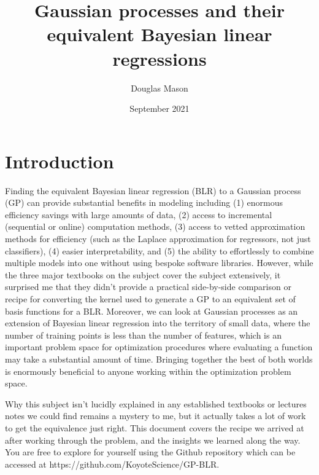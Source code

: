 \documentclass{article}
\title{Gaussian processes and their equivalent Bayesian linear regressions}
\author[1]{Douglas Mason}
\affil[1]{Koyote Science, LLC \footnote{\href{http://www.koyotescience.com}{\texttt{http://www.koyotescience.com}}}}
\date{September 2021}
\begin{document}
\maketitle

\tableofcontents

\pagestyle{fancy}

\section{Introduction}

Finding the equivalent Bayesian linear regression (BLR) to a Gaussian process (GP) can provide substantial benefits in modeling including (1) enormous efficiency savings with large amounts of data, (2) access to incremental (sequential or online) computation methods, (3) access to vetted approximation methods for efficiency (such as the Laplace approximation for regressors, not just classifiers), (4) easier interpretability, and (5) the ability to effortlessly to combine multiple models into one without using bespoke software libraries. However, while the three major textbooks on the subject \cite{bishop, murphy, rasmussen} cover the subject extensively, it surprised me that they didn't provide a practical side-by-side comparison or recipe for converting the kernel used to generate a GP to an equivalent set of basis functions for a BLR. Moreover, we can look at Gaussian processes as an extension of Bayesian linear regression into the territory of small data, where the number of training points is less than the number of features, which is an important problem space for optimization procedures where evaluating a function may take a substantial amount of time. Bringing together the best of both worlds is enormously beneficial to anyone working within the optimization problem space.

Why this subject isn't lucidly explained in any established textbooks or lectures notes we could find remains a mystery to me, but it actually takes a lot of work to get the equivalence just right. This document covers the recipe we arrived at after working through the problem, and the insights we learned along the way. You are free to explore for yourself using the  Github repository which can be accessed at https://github.com/KoyoteScience/GP-BLR.
\end{document}
